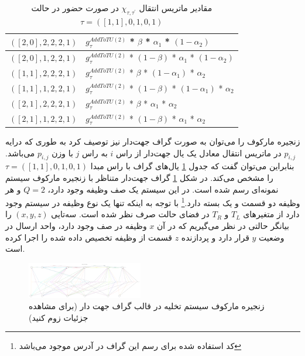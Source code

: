 \begin{table}[H]
\begin{latin}
\begin{tabular}{|l|l|}
$([2,0], 2, 2, 2, 1 )$ & $g_{\tau}^{A d d T o T U ( 2 )}$ * $\beta$ * $\alpha_1$ * $(1 - \alpha_2)$        \\ \hline
$([2,0], 1, 2, 2, 1 )$ & $g_{\tau}^{A d d T o T U ( 2 )}$ * $(1 - \beta)$ * $\alpha_1$ * $(1 - \alpha_2)$  \\ \hline
$([1,1], 2, 2, 2, 1 )$ & $g_{\tau}^{A d d T o T U ( 2 )}$ * $\beta$ * $(1 - \alpha_1)$ * $\alpha_2$        \\ \hline
$([1,1], 1, 2, 2, 1 )$ & $g_{\tau}^{A d d T o T U ( 2 )}$ * $(1 - \beta)$ * $(1 - \alpha_1)$ * $\alpha_2$  \\ \hline
$([2,1], 2, 2, 2, 1 )$ & $g_{\tau}^{A d d T o T U ( 2 )}$ * $\beta$ * $\alpha_1$ * $\alpha_2$              \\ \hline
$([2,1], 1, 2, 2, 1 )$ & $g_{\tau}^{A d d T o T U ( 2 )}$ * $(1 - \beta)$ * $\alpha_1$ * $\alpha_2$        \\ \hline



\end{tabular}
	\end{latin}
\caption{مقادیر ماتریس انتقال $\chi_{\tau, \tau^{\prime}}$ در صورت حضور در حالت $\tau = ( [1, 1], 0, 1, 0, 1 )$}
	\label{table:transitions}
\end{table}
زنجیره مارکوف را می‌توان به صورت گراف جهت‌دار نیز توصیف کرد به طوری که درایه $p_{i, j}$ در ماتریس انتقال معادل یک یال جهت‌دار از راس $i$ به راس $j$ با وزن $p_{i, j}$ می‌باشد. بنابراین می‌توان گفت که جدول \ref{table:transitions} یال‌های گراف با راس مبدا $\tau = ( [1, 1], 0, 1, 0, 1 )$ را مشخص می‌کند. در شکل \ref{fig:digraph} گراف جهت‌دار متناظر با زنجیره مارکوف سیستم نمونه‌ای رسم شده است. در این سیستم یک صف وظیفه وجود دارد، \(Q = 2\) و هر وظیفه دو قسمت و یک بسته دارد.\footnote{کد استفاده شده برای رسم این گراف در آدرس  موجود می‌باشد} با توجه به اینکه تنها یک نوع وظیفه در سیستم وجود دارد از متغیرهای $T_L$ و $T_R$ در فضای حالت صرف نظر شده است. سه‌تایی $(x, y, z)$ را بیانگر حالتی در نظر می‌گیریم که در آن $x$ وظیفه در صف وجود دارد، واحد ارسال در وضعیت $y$ قرار دارد و پردازنده $z$ قسمت از وظیفه تخصیص داده شده را اجرا کرده است.

\newpage
\begin{figure}[H]
\centering
\includegraphics[angle=270, origin=c, width=0.45\textwidth]{figures/graph.pdf}
\caption[زنجیره مارکوف سیستم تخلیه در قالب گراف جهت دار]{
زنجیره مارکوف سیستم تخلیه در قالب گراف جهت دار (برای مشاهده جزئیات زوم کنید)
}
\label{fig:digraph}
\end{figure}
\newpage
